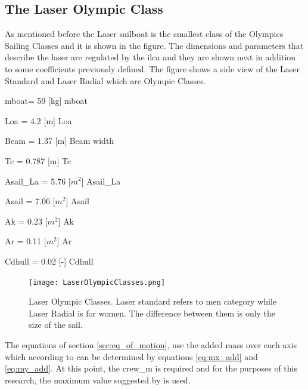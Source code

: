 \subsection{The Laser Olympic Class}
As mentioned before the Laser sailboat is the smallest class of the Olympics Sailing Classes and it is shown in the figure. The dimensions and parameters that describe the laser are regulated by the \acrfull{ilca} and they are shown next in addition to some coefficients previously defined. The figure shows a side view of the Laser Standard and Laser Radial which are Olympic Classes. %
\begin{description}
        \item \acrshort{mboat}= 59 [kg] \acrlong{mboat}
        \item \acrshort{Loa} = 4.2 [m] \acrlong{Loa}
        \item Beam = 1.37 [m] Beam width
        \item \acrshort{Tc} = 0.787 [m] \acrlong{Tc}
        \item \acrshort{Asail_La} = 5.76 [$m^2$] \acrlong{Asail_La}
        \item \acrshort{Asail} =  7.06 [$m^2$] \acrlong{Asail}
        \item \acrshort{Ak} = 0.23 [$m^2$] \acrlong{Ak}
        \item \acrshort{Ar} = 0.11 [$m^2$] \acrlong{Ar}
        \item \acrshort{Cdhull} = 0.02 [-] \acrlong{Cdhull}
    \end{description}
\begin{figure} [hbt!]
    \centering
    \texttt{[image: LaserOlympicClasses.png]}
    \caption{Laser Olympic Classes. Laser standard refers to men category while Laser Radial is for women. The difference between them is only the size of the sail. \cite{2015LaserAssociation}}
    \label{fig:LaserSideView}
\end{figure}
The equations of section \ref{sec:eq_of_motion}, use the added mass over each axis which according to \cite{keuning2004mathematical} can be determined by equations \ref{eq:mx_add} and \ref{eq:my_add}. At this point, the \acrshort{crew_m} is required and for the purposes of this research, the maximum value suggested by \cite{laser_opt} is used. 
